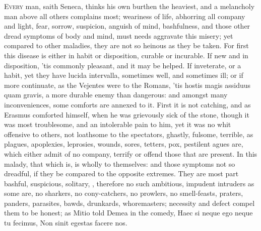 {\lettrine{E}{very} man, saith Seneca, thinks his own burthen the heaviest, and
a melancholy man above all others complains most; weariness of life,
abhorring all company and light, fear, sorrow, suspicion, anguish of
mind, bashfulness, and those other dread symptoms of body and mind,
must needs aggravate this misery; yet compared to other maladies, they
are not so heinous as they be taken. For first this disease is either
in habit or disposition, curable or incurable. If new and in
disposition, 'tis commonly pleasant, and it may be helped. If
inveterate, or a habit, yet they have lucida intervalla, sometimes
well, and sometimes ill; or if more continuate, as the Vejentes
were to the Romans, 'tis hostis magis assiduus quam gravis, a more
durable enemy than dangerous: and amongst many inconveniences, some
comforts are annexed to it. First it is not catching, and as Erasmus
comforted himself, when he was grievously sick of the stone, though it
was most troublesome, and an intolerable pain to him, yet it was no
whit offensive to others, not loathsome to the spectators, ghastly,
fulsome, terrible, as plagues, apoplexies, leprosies, wounds, sores,
tetters, pox, pestilent agues are, which either admit of no company,
terrify or offend those that are present. In this malady, that which
is, is wholly to themselves: and those symptoms not so dreadful, if
they be compared to the opposite extremes. They are most part bashful,
suspicious, solitary, \etc{}, therefore no such ambitious, impudent
intruders as some are, no sharkers, no cony-catchers, no prowlers, no
smell-feasts, praters, panders, parasites, bawds, drunkards,
whoremasters; necessity and defect compel them to be honest; as Mitio
told Demea in the comedy,
Haec si neque ego neque tu fecimus,
Non sinit egestas facere nos.

}
